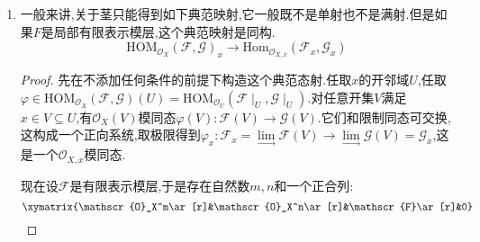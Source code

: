 \begin{enumerate}
\begin{proof}
		如果我们能证明在每个截面上这是一个正合列,就得到它是一个正合列(尽管反过来是不对的,如果它是正合列推不出在所有截面上是正合列).任取开集$U\subseteq X$,我们要证明有如下正合列:
		$$\xymatrix{0\ar[r]&\mathrm{HOM}_{\mathscr{O}_U}(\mathscr{F}_3\mid_U,\mathscr{G}\mid_U)\ar[r]^{\varphi^*}&\mathrm{HOM}_{\mathscr{O}_U}(\mathscr{F}_2\mid_U,\mathscr{G}\mid_U)\ar[r]^{\psi^*}&\mathrm{HOM}_{\mathscr{O}_U}(\mathscr{F}_1\mid_U,\mathscr{G}\mid_U)}$$
		\begin{itemize}
			\item $\ker\psi^*=\{0\}$.设$\alpha:\mathscr{F}_3\mid_U\to\mathscr{F}_2\mid_U$是$\mathscr{O}_U$模层之间的态射,满足$\psi^*(\alpha)=\alpha\circ\psi=0$.于是对任意$x\in U$就有$\alpha_x\circ\psi_x=0$.但是$\psi$是满态射,每个$\psi_x$是满同态,就导致$\alpha_x=0,\forall x\in U$,于是$\alpha=0$.
			\item $\mathrm{im}\psi^*\subseteq\ker\varphi^*$.这是因为$\psi\circ\varphi=0$.
			\item $\ker\varphi^*\subseteq\mathrm{im}\psi^*$.设$\alpha:\mathscr{F}_2\mid_U\to\mathscr{G}\mid_U$是$\mathscr{O}_U$模层态射,满足$\alpha\circ\varphi=0$.由于$\mathscr{F}_3\mid_U$是$\varphi\mid_U$的余核,就有$\alpha$要经$\psi\mid_U$分解,也即$\alpha\in\mathrm{im}\psi^*$.
		\end{itemize}
	\end{proof}
	\item 一般来讲,关于茎只能得到如下典范映射,它一般既不是单射也不是满射.但是如果$F$是局部有限表示模层,这个典范映射是同构.
	$$\mathrm{HOM}_{\mathscr{O}_X}(\mathscr{F},\mathscr{G})_x\to\mathrm{Hom}_{\mathscr{O}_{X,x}}(\mathscr{F}_x,\mathscr{G}_x)$$
	\begin{proof}
		
		先在不添加任何条件的前提下构造这个典范态射.任取$x$的开邻域$U$,任取$\varphi\in\mathrm{HOM}_{\mathscr{O}_X}(\mathscr{F},\mathscr{G})(U)=\mathrm{HOM}_{\mathscr{O}_U}(\mathscr{F}\mid_U,\mathscr{G}\mid_U)$.对任意开集$V$满足$x\in V\subseteq U$,有$\mathscr{O}_X(V)$模同态$\varphi(V):\mathscr{F}(V)\to\mathscr{G}(V)$.它们和限制同态可交换,这构成一个正向系统,取极限得到$\varphi_x:\mathscr{F}_x=\lim\limits_{\rightarrow}\mathscr{F}(V)\to\lim\limits_{\rightarrow}\mathscr{G}(V)=\mathscr{G}_x$,这是一个$\mathscr{O}_{X,x}$模同态.
		
		\qquad
		
		现在设$\mathscr{F}$是有限表示模层,于是存在自然数$m,n$和一个正合列:
		\begin{equation}\label{f.r}
			\xymatrix{\mathscr{O}_X^m\ar[r]&\mathscr{O}_X^n\ar[r]&\mathscr{F}\ar[r]&0}
		\end{equation}
		

\end{proof}
\end{enumerate}
